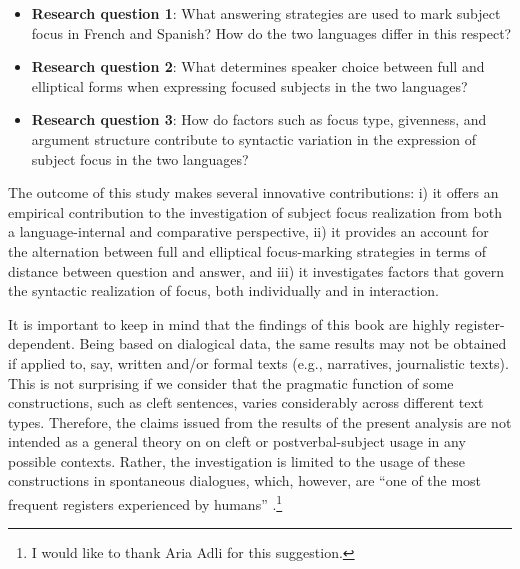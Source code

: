\begin{itemize}
\item \textbf{Research question 1}: What answering strategies are used to mark subject focus in French and Spanish? How do the two languages differ in this respect?
\item \textbf{Research question 2}: What determines speaker choice between full and elliptical forms when expressing focused subjects in the two languages?
\item \textbf{Research question 3}: How do factors such as focus type, givenness, and argument structure contribute to syntactic variation in the expression of subject focus in the two languages?
\end{itemize}

The outcome of this study makes several innovative contributions: i) it offers an empirical contribution to the investigation of subject focus realization from both a language-internal and comparative perspective, ii) it provides an account for the alternation between full and elliptical focus-marking strategies in terms of distance between question and answer, and iii) it investigates factors that govern the syntactic realization of focus, both individually and in interaction.

It is important to keep in mind that the findings of this book are highly register-dependent. Being based on dialogical data, the same results may not be obtained if applied to, say, written and/or formal texts (e.g., narratives, journalistic texts). This is not surprising if we consider that the pragmatic function of some constructions, such as cleft sentences, varies considerably across different text types. Therefore, the claims issued from the results of the present analysis are not intended as a general theory on on cleft or postverbal-subject usage in any possible contexts. Rather, the investigation is limited to the usage of these constructions in spontaneous dialogues, which, however, are ``one of the most frequent registers experienced by humans'' \parencite[836]{du1987discourse}.\footnote{I would like to thank Aria Adli for this suggestion.}

